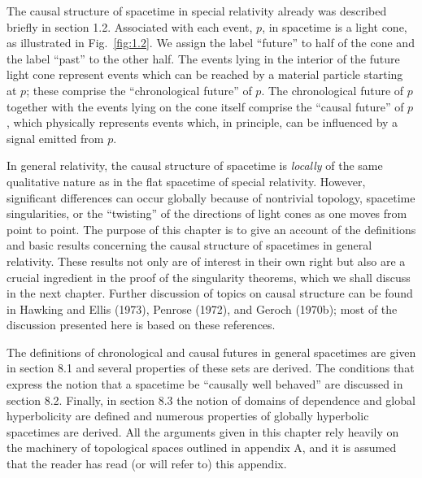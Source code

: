 
\begingroup
\edef\chaptereightpreviousfootnote{\number\value{footnote}}
\setcounter{footnote}{0}
\renewcommand{\thetheorem}{\thesubsection.\arabic{theorem}}

The causal structure of spacetime in special relativity already was described briefly
in section 1.2. Associated with each event, \(p\), in spacetime is a light cone, as
illustrated in Fig.~\ref{fig:1.2}. We assign the label ``future'' to half of the cone and the label
``past'' to the other half. The events lying in the interior of the future light cone
represent events which can be reached by a material particle starting at \(p\); these
comprise the ``chronological future'' of \(p\). The chronological future of \(p\) together with
the events lying on the cone itself comprise the ``causal future'' of \(p\), which physically
represents events which, in principle, can be influenced by a signal emitted from \(p\).

In general relativity, the causal structure of spacetime is \emph{locally} of the same
qualitative nature as in the flat spacetime of special relativity. However, significant
differences can occur globally because of nontrivial topology, spacetime singularities,
or the ``twisting'' of the directions of light cones as one moves from point to point. The
purpose of this chapter is to give an account of the definitions and basic results
concerning the causal structure of spacetimes in general relativity. These results not
only are of interest in their own right but also are a crucial ingredient in the proof of
the singularity theorems, which we shall discuss in the next chapter. Further discussion
of topics on causal structure can be found in Hawking and Ellis (1973), Penrose (1972),
and Geroch (1970b); most of the discussion presented here is based on these references.

The definitions of chronological and causal futures in general spacetimes are given
in section 8.1 and several properties of these sets are derived. The conditions that
express the notion that a spacetime be ``causally well behaved'' are discussed in
section 8.2. Finally, in section 8.3 the notion of domains of dependence and global
hyperbolicity are defined and numerous properties of globally hyperbolic spacetimes
are derived. All the arguments given in this chapter rely heavily on the machinery
of topological spaces outlined in appendix A, and it is assumed that the reader has
read (or will refer to) this appendix.


